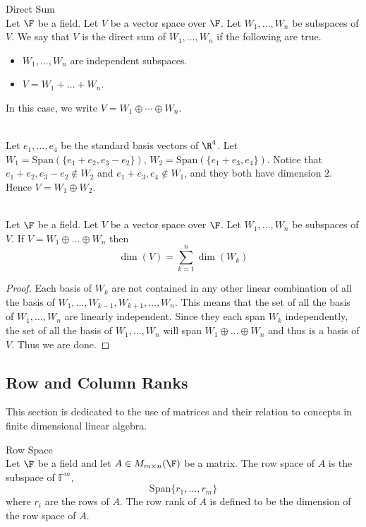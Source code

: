\documentclass[a4paper]{article}
\begin{document}
\begin{defn}{Direct Sum}{}\\
Let $\F$ be a field. Let $V$ be a vector space over $\F$. Let $W_1,\dots,W_n$ be subspaces of $V$. We say that $V$ is the direct sum of $W_1,\dots,W_n$ if the following are true. 
\begin{itemize}
\item $W_1,\dots,W_n$ are independent subspaces. 
\item $V=W_1+\dots+W_n$. 
\end{itemize}
In this case, we write $V=W_1\oplus\cdots\oplus W_n$. 
\end{defn}

\begin{eg}{}{}\\
Let $e_1,\dots,e_4$ be the standard basis vectors of $\R^4$. Let $W_1=\text{Span}(\{e_1+e_2,e_3-e_2\})$, $W_2=\text{Span}(\{e_1+e_3,e_4\})$. Notice that $e_1+e_2,e_3-e_2\notin W_2$ and $e_1+e_3,e_4\notin W_1$, and they both have dimension $2$. Hence $V=W_1\oplus W_2$. 
\end{eg}

\begin{crl}{}{}\\
Let $\F$ be a field. Let $V$ be a vector space over $\F$. Let $W_1,\dots,W_n$ be subspaces of $V$. If $V=W_1\oplus\dots\oplus W_n$ then $$\dim(V)=\sum_{k=1}^n\dim(W_k)$$ 
\begin{proof}
Each basis of $W_k$ are not contained in any other linear combination of all the basis of $W_1,\dots,W_{k-1},W_{k+1},\dots,W_n$. This means that the set of all the basis of $W_1,\dots,W_n$ are linearly independent. Since they each span $W_k$ independently, the set of all the basis of $W_1,\dots,W_n$ will span $W_1\oplus\dots\oplus W_n$ and thus is a basis of $V$. Thus we are done. 
\end{proof}
\end{crl}

\subsection{Row and Column Ranks}
This section is dedicated to the use of matrices and their relation to concepts in finite dimensional linear algebra. 

\begin{defn}{Row Space}{}\\
Let $\F$ be a field and let $A\in M_{m\times n}(\F)$ be a matrix. The row space of $A$ is the subspace of $\mathbb{F}^m$, $$\text{Span}\{r_1,\dots,r_m\}$$ where $r_i$ are the rows of $A$. The row rank of $A$ is defined to be the dimension of the row space of $A$. 
\end{defn}
\end{document}
